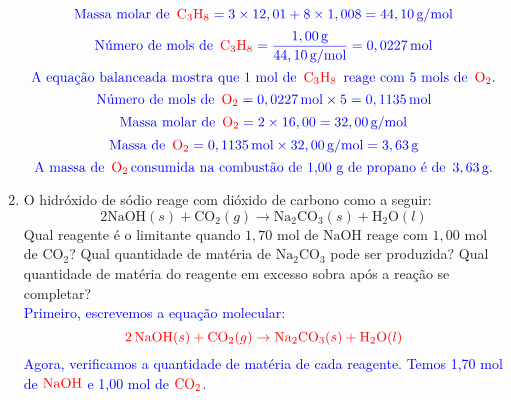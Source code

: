 \documentclass[a4paper, 12pt]{article}
\begin{document}
\begin{enumerate}
          \[
              \textcolor{blue}{\text{Massa molar de } \, \textcolor{red}{\text{C}_3\text{H}_8} = 3 \times 12,01 + 8 \times 1,008 = 44,10 \, \text{g/mol}}
          \]
          \textcolor{blue}{}
          \[
              \textcolor{blue}{\text{Número de mols de } \, \textcolor{red}{\text{C}_3\text{H}_8} = \frac{1,00 \, \text{g}}{44,10 \, \text{g/mol}} = 0,0227 \, \text{mol}}
          \]
          \textcolor{blue}{}
          \[
              \textcolor{blue}{\text{A equação balanceada mostra que 1 mol de } \, \textcolor{red}{\text{C}_3\text{H}_8} \, \text{ reage com 5 mols de } \, \textcolor{red}{\text{O}_2}.}
          \]
          \textcolor{blue}{}
          \[
              \textcolor{blue}{\text{Número de mols de } \, \textcolor{red}{\text{O}_2} = 0,0227 \, \text{mol} \times 5 = 0,1135 \, \text{mol}}
          \]
          \textcolor{blue}{}
          \[
              \textcolor{blue}{\text{Massa molar de } \, \textcolor{red}{\text{O}_2} = 2 \times 16,00 = 32,00 \, \text{g/mol}}
          \]
          \textcolor{blue}{}
          \[
              \textcolor{blue}{\text{Massa de } \, \textcolor{red}{\text{O}_2} = 0,1135 \, \text{mol} \times 32,00 \, \text{g/mol} = 3,63 \, \text{g}}
          \]
          \textcolor{blue}{}
          \[
              \textcolor{blue}{\text{A massa de } \, \textcolor{red}{\text{O}_2} \, \text{consumida na combustão de 1,00 g de propano é de } \, 3,63 \, \text{g}}.
          \]



    \item O hidróxido de sódio reage com dióxido de carbono como a seguir:
          \[
              2\text{NaOH}(s) + \text{CO}_{2}(g) \rightarrow \text{Na}_{2}\text{CO}_{3}
              (s) + \text{H}_{2}\text{O}(l)
          \]
          Qual reagente é o limitante quando $1,70$ mol de $\text{NaOH}$ reage com
          $1,00$ mol de $\text{CO}_{2}$? Qual quantidade de matéria de $\text{Na}_{2}
              \text{CO}_{3}$ pode ser produzida? Qual quantidade de matéria do reagente
          em excesso sobra após a reação se completar?
          \\[10pt]
          \textcolor{blue}{Primeiro, escrevemos a equação molecular:}
          \[
              \textcolor{red}{2 \, \text{NaOH} (s) + \text{CO}_2 (g) \rightarrow \text{Na}_2\text{CO}_3 (s) + \text{H}_2\text{O} (l)}
          \]
          \textcolor{blue}{Agora, verificamos a quantidade de matéria de cada reagente. Temos 1,70 mol de \(\textcolor{red}{\text{NaOH}}\) e 1,00 mol de \(\textcolor{red}{\text{CO}_2}\).}


\end{enumerate}
\end{document}

